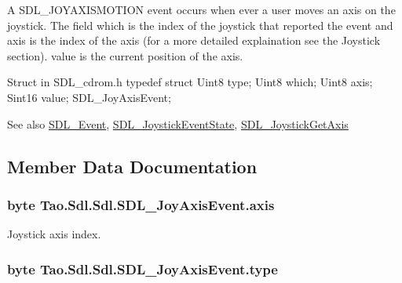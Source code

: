 A SDL\_\-JOYAXISMOTION event occurs when ever a user moves an axis on the joystick. The field which is the index of the joystick that reported the event and axis is the index of the axis (for a more detailed explaination see the Joystick section). value is the current position of the axis. 


\begin{DoxyCode}
Struct in SDL_cdrom.h
            typedef struct{
                        Uint8 type;
                        Uint8 which;
                        Uint8 axis;
                        Sint16 value;
                } SDL_JoyAxisEvent;
\end{DoxyCode}


\begin{DoxySeeAlso}{See also}
\hyperlink{struct_tao_1_1_sdl_1_1_s_d_l___event}{SDL\_\-Event}, \hyperlink{_sdl_8cs_a4b5786d792bade406949c738f0290eca}{SDL\_\-JoystickEventState}, \hyperlink{_sdl_8cs_ab6c4b492ca0368f81c3aef8c49ebf21d}{SDL\_\-JoystickGetAxis}


\end{DoxySeeAlso}


\subsection{Member Data Documentation}
\hypertarget{struct_tao_1_1_sdl_1_1_sdl_1_1_s_d_l___joy_axis_event_a960c36c78c9a4a05890cdd20b191505f}{
\subsubsection[{axis}]{\setlength{\rightskip}{0pt plus 5cm}byte {\bf Tao.Sdl.Sdl.SDL\_\-JoyAxisEvent.axis}}}
\label{struct_tao_1_1_sdl_1_1_sdl_1_1_s_d_l___joy_axis_event_a960c36c78c9a4a05890cdd20b191505f}


Joystick axis index. 

\hypertarget{struct_tao_1_1_sdl_1_1_sdl_1_1_s_d_l___joy_axis_event_ae28dc8524a0c589e54e7fc31381d3279}{
\subsubsection[{type}]{\setlength{\rightskip}{0pt plus 5cm}byte {\bf Tao.Sdl.Sdl.SDL\_\-JoyAxisEvent.type}}}
\label{struct_tao_1_1_sdl_1_1_sdl_1_1_s_d_l___joy_axis_event_ae28dc8524a0c589e54e7fc31381d3279}



